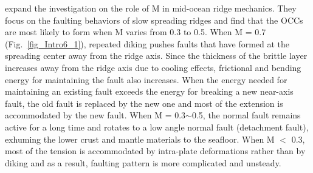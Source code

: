 \citet{Tucholke2008} expand the investigation on the role of M in mid-ocean ridge mechanics. They focus on the faulting behaviors of slow spreading ridges and find that the OCCs are most likely to form when M varies from 0.3 to 0.5. When M = 0.7 (Fig.~\ref{fig_Intro6_1}), repeated diking pushes faults that have formed at the spreading center away from the ridge axis. Since the thickness of the brittle layer increases away from the ridge axis due to cooling effects, frictional and bending energy for maintaining the fault also increases. When the energy needed for maintaining an existing fault exceeds the energy for breaking a new near-axis fault, the old fault is replaced by the new one and most of the extension is accommodated by the new fault. When M = 0.3$\sim$0.5, the normal fault remains active for a long time and rotates to a low angle normal fault (detachment fault), exhuming the lower crust and mantle materials to the seafloor. When M $<$ 0.3, most of the tension is accommodated by intra-plate deformations rather than by diking and as a result, faulting pattern is more complicated and unsteady.

